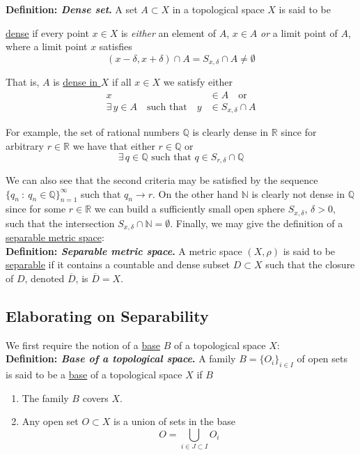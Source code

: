 \documentclass[12pt]{article}
\newlength\tindent
\renewcommand{\indent}{\hspace*{\tindent}}
\newcommand{\R}{\mathbb R}
\newcommand{\N}{\mathbb N}
\newcommand{\Q}{\mathbb Q}
\begin{document}
%
%
%
{\bf Definition: {\em Dense set}.} A set $A \subset X$ in a topological space $X$ is said to be {\underline{dense} if every point $x \in X$ is {\em either} an element of $A$, $x \in A$ {\em or} a limit point of $A$, where a limit point $x$ satisfies
\begin{equation*}
	(x - \delta, x + \delta) \cap A = S_{x,\delta} \cap A \neq \emptyset
\end{equation*}

That is, $A$ is \underline{dense in $X$} if all $x \in X$ we satisfy either
\begin{align*}
	x &\in A \quad \text{or} \\
	\exists\,y \in A \quad \text{such that} \quad y &\in S_{x, \delta} \cap A
\end{align*}

\indent For example, the set of rational numbers $\Q$ is clearly dense in $\R$ since for arbitrary $r \in \R$ we have that either $r \in \Q$ or
\begin{equation*}
	\exists\,q\in \Q \text{ such that } q \in S_{r,\delta} \cap \Q
\end{equation*}

\indent We can also see that the second criteria may be satisfied by the sequence $\{q_n ~:~ q_n \in \Q\}^\infty_{n = 1}$ such that $q_n \to r$. On the other hand $\N$ is clearly not dense in $\Q$ since for some $r \in \R$ we can build a sufficiently small open sphere $S_{x,\delta}$, $\delta > 0$, such that the intersection $S_{x,\delta} \cap \N = \emptyset$. Finally, we may give the definition of a \underline{separable metric space}: \\

%
%
{\bf Definition: {\em Separable metric space}.} A metric space $(X, \rho)$ is said to be \underline{separable} if it contains a countable and dense subset $D \subset X$ such that the closure of $D$, denoted $\overline{D}$, is $\overline{D} = X$. 

\subsection{Elaborating on Separability}

We first require the notion of a \underline{base} $B$ of a topological space $X$: \\

%
%
{\bf Definition: {\em Base of a topological space}.} A family $B = \{O_i\}_{i \in I}$ of open sets is said to be a \underline{base} of a topological space $X$ if $B$ 
\begin{enumerate}
	\item The family $B$ covers $X$.
	\item Any open set $O \subset X$ is a union of sets in the base
	\begin{equation*}
		O = \bigcup_{i \in J \subset I} O_i
	\end{equation*}
\end{enumerate}

}
\end{document}
